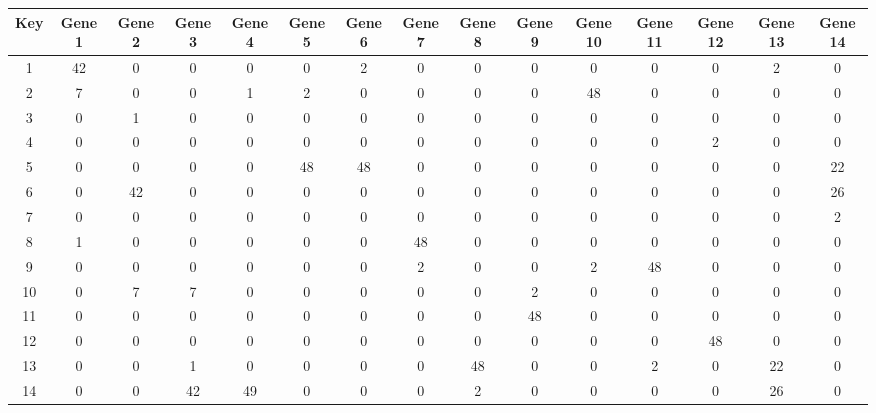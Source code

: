 \begin{tabular}{|c|c|c|c|c|c|c|c|c|c|c|c|c|c|c|}
\hline
Key & Gene 1 & Gene 2 & Gene 3 & Gene 4 & Gene 5 & Gene 6 & Gene 7 & Gene 8 & Gene 9 & Gene 10 & Gene 11 & Gene 12 & Gene 13 & Gene 14 \\
\hline
1 & 42 & 0 & 0 & 0 & 0 & 2 & 0 & 0 & 0 & 0 & 0 & 0 & 2 & 0 \\
2 & 7 & 0 & 0 & 1 & 2 & 0 & 0 & 0 & 0 & 48 & 0 & 0 & 0 & 0 \\
3 & 0 & 1 & 0 & 0 & 0 & 0 & 0 & 0 & 0 & 0 & 0 & 0 & 0 & 0 \\
4 & 0 & 0 & 0 & 0 & 0 & 0 & 0 & 0 & 0 & 0 & 0 & 2 & 0 & 0 \\
5 & 0 & 0 & 0 & 0 & 48 & 48 & 0 & 0 & 0 & 0 & 0 & 0 & 0 & 22 \\
6 & 0 & 42 & 0 & 0 & 0 & 0 & 0 & 0 & 0 & 0 & 0 & 0 & 0 & 26 \\
7 & 0 & 0 & 0 & 0 & 0 & 0 & 0 & 0 & 0 & 0 & 0 & 0 & 0 & 2 \\
8 & 1 & 0 & 0 & 0 & 0 & 0 & 48 & 0 & 0 & 0 & 0 & 0 & 0 & 0 \\
9 & 0 & 0 & 0 & 0 & 0 & 0 & 2 & 0 & 0 & 2 & 48 & 0 & 0 & 0 \\
10 & 0 & 7 & 7 & 0 & 0 & 0 & 0 & 0 & 2 & 0 & 0 & 0 & 0 & 0 \\
11 & 0 & 0 & 0 & 0 & 0 & 0 & 0 & 0 & 48 & 0 & 0 & 0 & 0 & 0 \\
12 & 0 & 0 & 0 & 0 & 0 & 0 & 0 & 0 & 0 & 0 & 0 & 48 & 0 & 0 \\
13 & 0 & 0 & 1 & 0 & 0 & 0 & 0 & 48 & 0 & 0 & 2 & 0 & 22 & 0 \\
14 & 0 & 0 & 42 & 49 & 0 & 0 & 0 & 2 & 0 & 0 & 0 & 0 & 26 & 0 \\
\hline
\end{tabular}